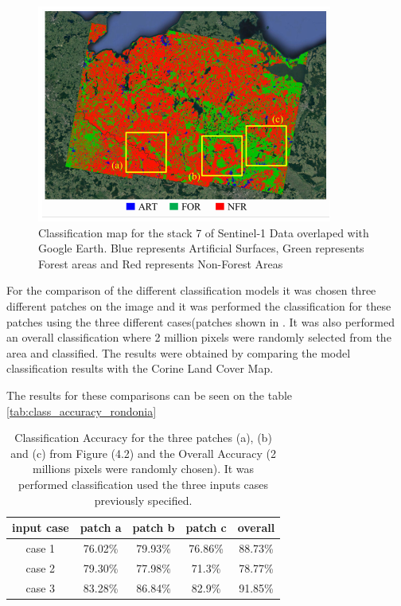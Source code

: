 \begin{figure}[H]
    \centering
    \includegraphics{Cap4/classificacao3.png}
    \caption{Classification map for the stack 7 of Sentinel-1 Data overlaped with Google Earth. Blue represents Artificial Surfaces, Green represents Forest areas and Red represents Non-Forest Areas}
    \label{fig:classification_germany}
\end{figure}

For the comparison of the different classification models it was chosen three different patches on the image and it was performed the classification for these patches using the three different cases(patches shown in . It was also performed an overall classification where 2 million pixels were randomly selected from the area and classified. The results were obtained by comparing the model classification results with the Corine Land Cover Map.

The results for these comparisons can be seen on the table \ref{tab:class_accuracy_rondonia}

\begin{table}[H]
    \centering
    \begin{tabular}{c|c|c|c|c}
    \hline
         input case&patch a&patch b&patch c& overall  \\
         \hline
         case 1 & 76.02\%&79.93\%&76.86\%&88.73\%\\
         case 2 &79.30\%&77.98\%&71.3\%&78.77\%\\
         case 3&83.28\%&86.84\%&82.9\%&91.85\%\\
         \hline
         
    \end{tabular}
    \caption{Classification Accuracy for the three patches (a), (b) and (c) from Figure (4.2) and the Overall Accuracy (2 millions pixels were randomly chosen). It was performed classification used the three inputs cases previously specified.}
    \label{tab:class_accuracy_corine}
\end{table}

